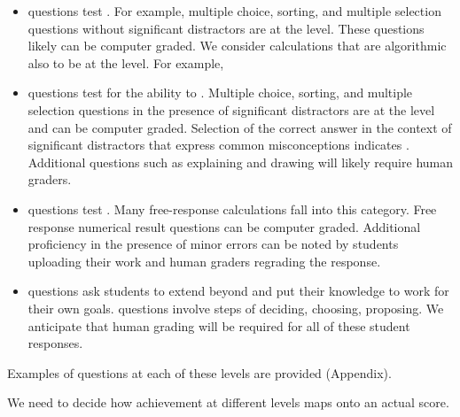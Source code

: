 \documentclass[10pt,letterpaper]{article}
\begin{document}
\begin{itemize}
\item \Recall questions test . For example, multiple choice, sorting, and multiple selection questions without significant distractors are at the \recall level. These questions likely can be computer graded. We consider calculations that are algorithmic also to be at the \recall level. For example,   
\item \Comprehension questions test for the ability to . Multiple choice, sorting,  and multiple selection questions in the presence of  significant distractors are at the \comprehension level and can be computer graded. Selection of the correct answer in the context of significant distractors that express common misconceptions indicates \comprehension. Additional questions such as explaining and drawing will likely require human graders.   
\item \Analysis questions test . Many free-response calculations fall into this category. Free response numerical result questions can be computer graded. Additional proficiency in the presence of minor errors can be noted by students uploading their work and human graders regrading the response.
\item \Use questions ask students to extend beyond \analysis and put their knowledge to work for their own goals. \Use questions involve steps of deciding, choosing, proposing. We anticipate that human grading will be required for all of these student responses.
\end{itemize}
Examples of questions at each of these levels are provided (Appendix).
%

 We need to decide how achievement at different levels maps onto an actual score. 
\end{document}
